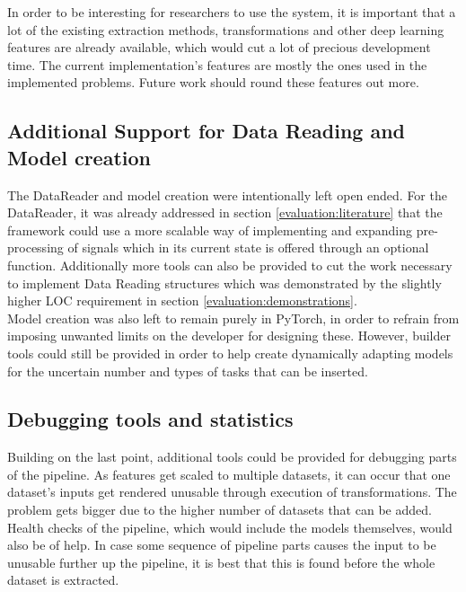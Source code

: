 In order to be interesting for researchers to use the system, it is important that a lot of the existing extraction methods, transformations and other deep learning features are already available, which would cut a lot of precious development time. The current implementation's features are mostly the ones used in the implemented problems. Future work should round these features out more.

\subsection{Additional Support for Data Reading and Model creation}

The DataReader and model creation were intentionally left open ended. For the DataReader, it was already addressed in section \ref{evaluation:literature} that the framework could use a more scalable way of implementing and expanding pre-processing of signals which in its current state is offered through an optional function. Additionally more tools can also be provided to cut the work necessary to implement Data Reading structures which was demonstrated by the slightly higher LOC requirement in section \ref{evaluation:demonstrations}. \\

Model creation was also left to remain purely in PyTorch, in order to refrain from imposing unwanted limits on the developer for designing these. However, builder tools could still be provided in order to help create dynamically adapting models for the uncertain number and types of tasks that can be inserted.\\

\subsection{Debugging tools and statistics}

Building on the last point, additional tools could be provided for debugging parts of the pipeline. As features get scaled to multiple datasets, it can occur that one dataset's inputs get rendered unusable through execution of transformations. The problem gets bigger due to the higher number of datasets that can be added. Health checks of the pipeline, which would include the models themselves, would also be of help. In case some sequence of pipeline parts causes the input to be unusable further up the pipeline, it is best that this is found before the whole dataset is extracted.\\

